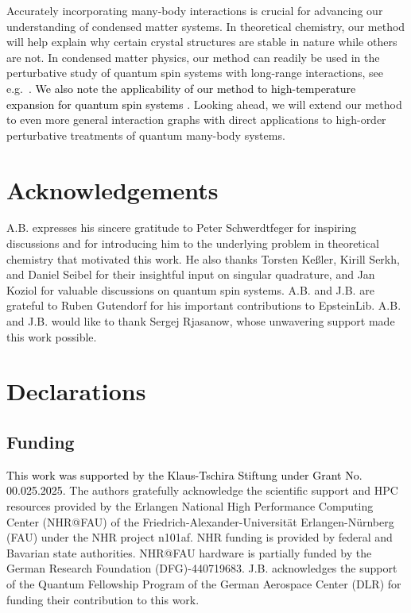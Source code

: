 \documentclass[]{amsart}
\numberwithin{mythm}{section}
\newcommand{\new}[1]{{\textcolor{black}{#1}}}
\begin{document}
Accurately incorporating many-body interactions is crucial for advancing our understanding of condensed matter systems. In theoretical chemistry, our method will help explain why certain crystal structures  are stable in nature while others are not. In condensed matter physics, our method can readily be used in the perturbative study of quantum spin systems with long-range interactions, see e.g.~\cite{adelhardt2024monte, fey2019quantum}. \new{We also note the applicability of our method to high-temperature expansion for quantum spin systems \cite{burkard2026dynamic,burkard2026high}.}
Looking ahead, we will extend our method to even more general interaction graphs with direct applications to high-order perturbative treatments of quantum many-body systems.



\section*{Acknowledgements}

A.B. expresses his sincere gratitude to Peter Schwerdtfeger for inspiring discussions and for introducing him to the underlying problem in theoretical chemistry that motivated this work. He also thanks Torsten Keßler, Kirill Serkh, and Daniel Seibel for their insightful input on singular quadrature, and Jan Koziol for valuable discussions on quantum spin systems. A.B. and J.B. are grateful to Ruben Gutendorf for his important contributions to EpsteinLib. A.B. and J.B. would like to thank Sergej Rjasanow, whose unwavering support made this work possible.


\section*{Declarations}

\subsection*{Funding}
\new{This work was supported by the Klaus-Tschira Stiftung under Grant No. 00.025.2025. }
The authors gratefully acknowledge the scientific support and HPC resources provided by the Erlangen National High Performance Computing Center (NHR@FAU) of the Friedrich-Alexander-Universit\"at Erlangen-N\"urnberg (FAU) under the NHR project n101af. NHR funding is provided by federal and Bavarian state authorities. NHR@FAU hardware is partially funded by the German Research Foundation (DFG)-440719683. 
J.B. acknowledges the support of the Quantum Fellowship Program of the German Aerospace Center (DLR) for funding their contribution to this work.
\end{document}
